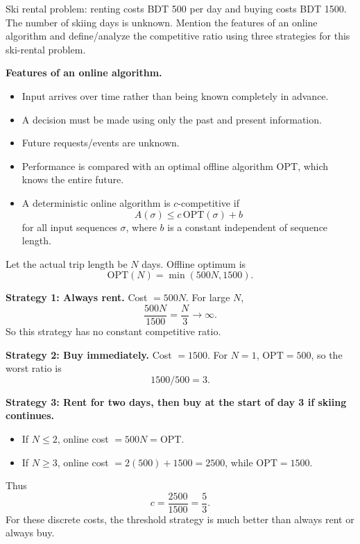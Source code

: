 \documentclass[11pt,a4paper]{article}
\newcommand{\OPT}{\mathrm{OPT}}
\begin{document}
\begin{qaquestion}
Ski rental problem: renting costs BDT 500 per day and buying costs BDT 1500. The number of skiing days is unknown. Mention the features of an online algorithm and define/analyze the competitive ratio using three strategies for this ski-rental problem.
\end{qaquestion}
\begin{qaanswer}[Answer 7(a)]
\textbf{Features of an online algorithm.}
\begin{itemize}[leftmargin=*]
\item Input arrives over time rather than being known completely in advance.
\item A decision must be made using only the past and present information.
\item Future requests/events are unknown.
\item Performance is compared with an optimal offline algorithm \(\OPT\), which knows the entire future.
\item A deterministic online algorithm is \(c\)-competitive if
\[
A(\sigma)\le c\,\OPT(\sigma)+b
\]
for all input sequences \(\sigma\), where \(b\) is a constant independent of sequence length.
\end{itemize}

Let the actual trip length be \(N\) days. Offline optimum is
\[
\OPT(N)=\min(500N,1500).
\]

\textbf{Strategy 1: Always rent.} Cost \(=500N\). For large \(N\),
\[
\frac{500N}{1500}=\frac{N}{3}\to\infty.
\]
So this strategy has no constant competitive ratio.

\textbf{Strategy 2: Buy immediately.} Cost \(=1500\). For \(N=1\), \(\OPT=500\), so the worst ratio is
\[
\boxed{1500/500=3}.
\]

\textbf{Strategy 3: Rent for two days, then buy at the start of day 3 if skiing continues.}
\begin{itemize}[leftmargin=*]
\item If \(N\le2\), online cost \(=500N=\OPT\).
\item If \(N\ge3\), online cost \(=2(500)+1500=2500\), while \(\OPT=1500\).
\end{itemize}
Thus
\[
\boxed{c=\frac{2500}{1500}=\frac53}.
\]
For these discrete costs, the threshold strategy is much better than always rent or always buy.
\end{qaanswer}
\end{document}
